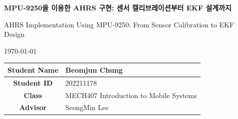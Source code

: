 \begin{titlepage}
  \begin{center}

    \vspace*{3cm}

    {\LARGE\bfseries
        MPU-9250을 이용한 AHRS 구현: 센서 캘리브레이션부터 EKF 설계까지
    }

    \vspace{1.2em}

    {\large
      AHRS Implementation Using MPU-9250: From Sensor Calibration to EKF Design
    }

    \vspace{3cm}

    {\large \today}

    \vfill
    
    \begin{table}[h]
      \centering
      \renewcommand{\arraystretch}{1.5} %
      \begin{tabular}{c || l}
        \textbf{Student Name} & Beomjun Chung \\ \hline
        \textbf{Student ID}   & 202211178 \\ \hline
        \textbf{Class}        & MECH407 Introduction to Mobile Systems \\ \hline
        \textbf{Advisor}      & SeongMin Lee \\
      \end{tabular}
    \end{table}
    
    \vspace{1cm} %

  \end{center}
\end{titlepage}